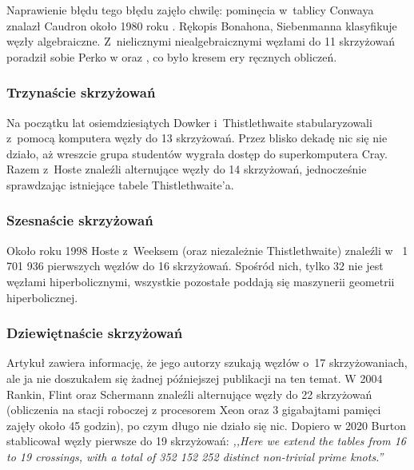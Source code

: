 Naprawienie błędu tego błędu zajęło chwilę: pominęcia w~tablicy Conwaya znalazł Caudron około 1980 roku \cite{caudron82}.
Rękopis \cite{bonahon80} Bonahona, Siebenmanna klasyfikuje węzły algebraiczne.
Z~nielicznymi niealgebraicznymi węzłami do 11 skrzyżowań poradził sobie Perko w \cite{perko80} oraz \cite{perko82}, co było kresem ery ręcznych obliczeń.


\subsubsection{Trzynaście skrzyżowań}
Na początku lat osiemdziesiątych Dowker i~Thistlethwaite \cite{dowker83} stabularyzowali z~pomocą komputera węzły do 13 skrzyżowań.
Przez blisko dekadę nic się nie działo, aż wreszcie grupa studentów wygrała dostęp do superkomputera Cray.
Razem z~Hoste znaleźli alternujące węzły do 14 skrzyżowań, jednocześnie sprawdzając istniejące tabele Thistlethwaite'a.

\subsubsection{Szesnaście skrzyżowań}
Około roku 1998 Hoste z~Weeksem (oraz niezależnie Thistlethwaite) znaleźli w~\cite{thistlethwaite98} 1 701 936 pierwszych węzłów do 16 skrzyżowań.
Spośród nich, tylko 32 nie jest węzłami hiperbolicznymi, wszystkie pozostałe poddają się maszynerii geometrii hiperbolicznej.

\subsubsection{Dziewiętnaście skrzyżowań}
Artykuł \cite{thistlethwaite98} zawiera informację, że jego autorzy szukają węzłów o~17 skrzyżowaniach, ale ja nie doszukałem się żadnej późniejszej publikacji na ten temat.
W 2004 Rankin, Flint oraz Schermann \cite{rankin04} znaleźli alternujące węzły do 22 skrzyżowań (obliczenia na stacji roboczej z procesorem Xeon oraz 3 gigabajtami pamięci zajęły około 45 godzin), po czym długo nie działo się nic.
Dopiero w 2020 Burton \cite{burton20} stablicował węzły pierwsze do 19 skrzyżowań: \emph{,,Here we extend the tables from 16 to 19 crossings, with a total of 352 152 252 distinct non-trivial prime knots.''}


